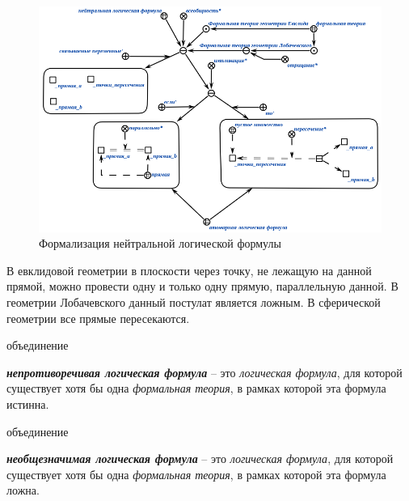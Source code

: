 \begin{figure}[http]
	\includegraphics[scale=0.8]{author/part2/figures/logic/neutral_formula.png}
	\caption{Формализация нейтральной логической формулы}
	\label{fig:neutral_formula}
\end{figure}

В евклидовой геометрии в плоскости через точку, не лежащую на данной прямой, можно провести одну и только одну прямую, параллельную данной. В геометрии Лобачевского данный постулат является ложным.
В сферической геометрии все прямые пересекаются.

\begin{SCn}
\begin{scnreltoset}{объединение}
\end{scnreltoset}
\end{SCn}

\textbf{\textit{непротиворечивая логическая формула}} -- это \textit{логическая формула}, для которой существует хотя бы одна \textit{формальная теория}, в рамках которой эта формула истинна.

\begin{SCn}
\begin{scnreltoset}{объединение}
\end{scnreltoset}
\end{SCn}

\textbf{\textit{необщезначимая логическая формула}} -- это \textit{логическая формула}, для которой существует хотя бы одна \textit{формальная теория}, в рамках которой эта формула ложна.


